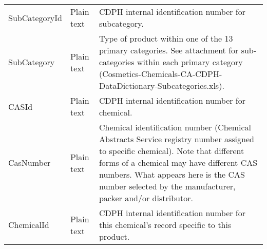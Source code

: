 \begin{table}[]
\begin{tabular}{@{}lll@{}}
SubCategoryId          & Plain text & CDPH internal identification number for subcategory.                                                                                                                                                                                                                                                                                                                                                                                                                  \\
SubCategory            & Plain text & Type of product within one of the 13 primary categories. See attachment for sub-categories within each primary category (Cosmetics-Chemicals-CA-CDPH-DataDictionary-Subcategories.xls).                                                                                                                                                                                                                                                                               \\
CASId                  & Plain text & CDPH internal identification number for chemical.                                                                                                                                                                                                                                                                                                                                                                                                                     \\
CasNumber              & Plain text & Chemical identification number (Chemical Abstracts Service registry number assigned to specific chemical). Note that different forms of a chemical  may have different CAS numbers. What appears here is the CAS number selected by the manufacturer, packer and/or distributor.                                                                                                                                                                                      \\
ChemicalId             & Plain text & CDPH internal identification number for this chemical's record specific to this product.                                                                                                                                                                                                                                                                                                                                                                              \\

\end{tabular}
\end{table}
